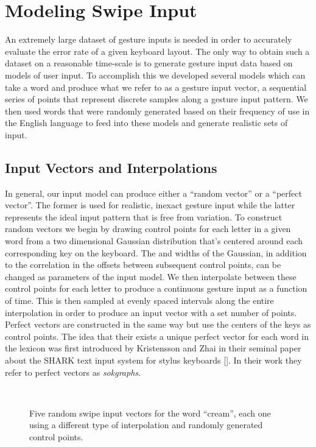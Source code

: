 \documentclass[final,1p,times,authoryear]{elsarticle}
\begin{document}
\section{\textbf{Modeling Swipe Input}}\label{sec:Modeling-Swipe-Input}

An extremely large dataset of gesture inputs is needed in order to accurately
evaluate the error rate of a given keyboard layout. The only way to 
obtain such a dataset on a reasonable time-scale is to generate
gesture input data based on models of user input. To accomplish
this we developed several models which can take a word and produce
what we refer to as a gesture input vector, a sequential series of 
points that represent discrete samples along a gesture input pattern. We then
used words that were randomly generated based on their frequency of
use in the English language to feed into these models and generate
realistic sets of input.


\subsection{Input Vectors and Interpolations\label{sub:Input-Vectors-and}}
In general, our input model can produce either a ``random vector''
or a ``perfect vector''. The former is used for realistic, inexact
gesture input while the latter represents the ideal input pattern that
is free from variation. To construct random vectors we begin by drawing
control points for each letter in a given word from a two dimensional
Gaussian distribution that's centered around each corresponding key
on the keyboard. The  and  widths of the Gaussian, in addition
to the correlation in the offsets between subsequent control points,
can be changed as parameters of the input model. We then interpolate
between these control points for each letter to produce a continuous
gesture input as a function of time. This is then sampled at evenly
spaced intervals along the entire interpolation in order to produce an input
vector with a set number of points. Perfect vectors are constructed
in the same way but use the centers of the keys as control points. The
idea that their exists a unique perfect vector for each word in the lexicon was first 
introduced by Kristensson and Zhai in their seminal paper about the SHARK 
text input system for stylus keyboards [\cite{SHARK2}]. In their work they 
refer to perfect vectors as \textit{sokgraphs}.

\begin{figure}[tp]
\begin{centering}
 \\
\par\end{centering}
\protect\caption{Five random swipe input vectors for the word ``cream'', each one
using a different type of interpolation and randomly generated control
points.\label{fig:Five-different-random}}
\end{figure}
\end{document}
